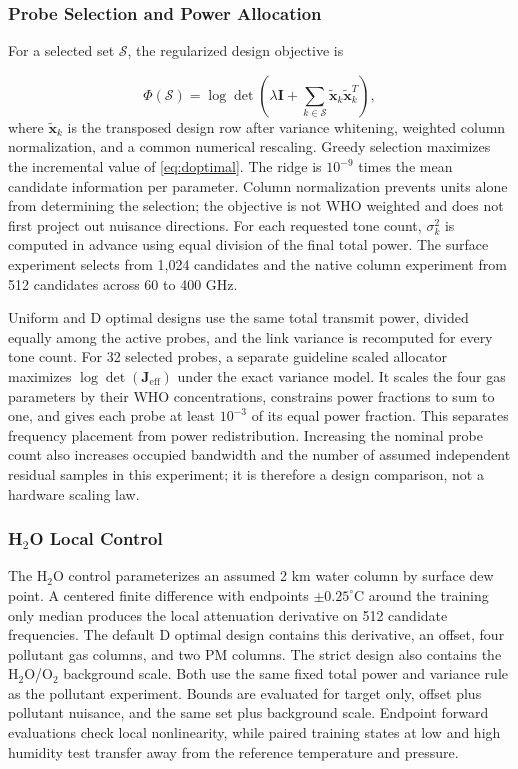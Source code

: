 \documentclass[conference]{IEEEtran}
\begin{document}
\subsubsection{Probe Selection and Power Allocation}

For a selected set $\mathcal{S}$, the regularized design objective is \cite{atkinson2007}

\begin{equation}
\Phi(\mathcal{S})=\log\det\!\left(\lambda\boldsymbol I+
\sum_{k\in\mathcal{S}}\widetilde{\boldsymbol x}_k
\widetilde{\boldsymbol x}_k^T\right),
\label{eq:doptimal}
\end{equation}
where $\widetilde{\boldsymbol x}_k$ is the transposed design row after variance whitening, weighted column normalization, and a common numerical rescaling. Greedy selection maximizes the incremental value of \eqref{eq:doptimal}. The ridge is $10^{-9}$ times the mean candidate information per parameter. Column normalization prevents units alone from determining the selection; the objective is not WHO weighted and does not first project out nuisance directions. For each requested tone count, $\sigma_k^2$ is computed in advance using equal division of the final total power. The surface experiment selects from 1,024 candidates and the native column experiment from 512 candidates across 60 to 400 GHz.

Uniform and D optimal designs use the same total transmit power, divided equally among the active probes, and the link variance is recomputed for every tone count. For 32 selected probes, a separate guideline scaled allocator maximizes $\log\det(\boldsymbol J_{\mathrm{eff}})$ under the exact variance model. It scales the four gas parameters by their WHO concentrations, constrains power fractions to sum to one, and gives each probe at least $10^{-3}$ of its equal power fraction. This separates frequency placement from power redistribution. Increasing the nominal probe count also increases occupied bandwidth and the number of assumed independent residual samples in this experiment; it is therefore a design comparison, not a hardware scaling law.

\subsubsection{H$_2$O Local Control}

The H$_2$O control parameterizes an assumed 2 km water column by surface dew point. A centered finite difference with endpoints $\pm0.25^\circ$C around the training only median produces the local attenuation derivative on 512 candidate frequencies. The default D optimal design contains this derivative, an offset, four pollutant gas columns, and two PM columns. The strict design also contains the H$_2$O/O$_2$ background scale. Both use the same fixed total power and variance rule as the pollutant experiment. Bounds are evaluated for target only, offset plus pollutant nuisance, and the same set plus background scale. Endpoint forward evaluations check local nonlinearity, while paired training states at low and high humidity test transfer away from the reference temperature and pressure.
\end{document}
